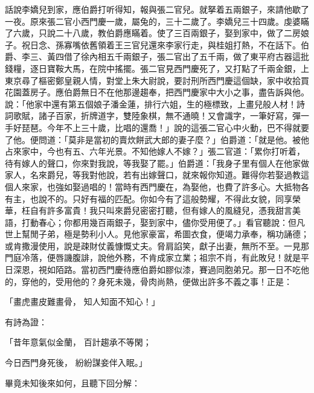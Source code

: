 \begin{showcontents}{}
話說李嬌兒到家，應伯爵打听得知，報與張二官兒。就拏着五兩銀子，來請他歇了一夜。原來張二官小西門慶一歲，屬兔的，三十二歲了。李嬌兒三十四歲。虔婆瞞了六歲，只說二十八歲，教伯爵應瞞着。使了三百兩銀子，娶到家中，做了二房娘子。祝日念、孫寡嘴依舊領着王三官兒還來李家行走，與桂姐打熱，不在話下。伯爵、李三、黃四借了徐內相五千兩銀子，張二官出了五千兩，做了東平府古器這批錢糧，逐日寶鞍大馬，在院中搖擺。張二官見西門慶死了，又打點了千兩金銀，上東京尋了樞密鄭皇親人情，對堂上朱大尉說，要討刑所西門慶這個缺，家中收拾買花園蓋房子。應伯爵無日不在他那邊趨奉，把西門慶家中大小之事，盡告訴與他。說：「他家中還有第五個娘子潘金蓮，排行六姐，生的極標致，上畫兒般人材！詩詞歌賦，諸子百家，折牌道字，雙陸象棋，無不通曉！又會識字，一筆好寫，彈一手好琵琶。今年不上三十歲，比唱的還喬！」說的這張二官心中火動，巴不得就要了他。便問道：「莫非是當初的賣炊餅武大郎的妻子麼？」伯爵道：「就是他。被他占來家中，今也有五、六年光景。不知他嫁人不嫁？」張二官道：「累你打听着，待有嫁人的聲口，你來對我說，等我娶了罷。」伯爵道：「我身子里有個人在他家做家人，名來爵兒，等我對他說，若有出嫁聲口，就來報你知道。難得你若娶過教這個人來家，也強如娶過唱的！當時有西門慶在，為娶他，也費了許多心。大抵物各有主，也說不的。只好有福的匹配。你如今有了這般勢耀，不得此女貌，同享榮華，枉自有許多富貴！我只叫來爵兒密密打聽，但有嫁人的風縫兒，憑我甜言美語，打動春心；你都用幾百兩銀子，娶到家中，儘你受用便了。」看官聽說：但凡世上幫閒子弟，極是勢利小人。見他家豪富，希圖衣食，便竭力承奉，稱功誦德；或肯撒漫使用，說是疎財仗義慷慨丈夫。脅肩諂笑，獻子出妻，無所不至。一見那門庭冷落，便唇譏腹誹，說他外務，不肯成家立業；祖宗不肖，有此敗兒！就是平日深恩，視如陌路。當初西門慶待應伯爵如膠似漆，賽過同胞弟兄。那一日不吃他的，穿他的，受用他的？身死未幾，骨肉尚熱，便做出許多不義之事！正是：

「畫虎畫皮難畫骨，  知人知面不知心！」

有詩為證：

「昔年意氣似金蘭，  百計趨承不等閑；

今日西門身死後，  紛紛謀妾伴入眠。」

畢竟未知後來如何，且聽下回分解：





\end{showcontents}


